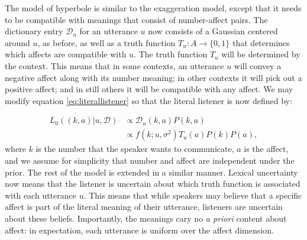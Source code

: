 \documentclass{article} %
\newcommand{\dictionary}{\ensuremath{\mathcal{D}}\xspace}
\begin{document}
The model of hyperbole is similar to the exaggeration model, except that it needs to be compatible with meanings that consist of number-affect pairs. The dictionary entry $\dictionary_u$ for an utterance $u$ now consists of a Gaussian centered around $u$, as before, as well as a truth function $T_u:A\rightarrow \{0,1\}$ that determines which affects are compatible with $u$. The truth function $T_u$ will be determined by the context. This means that in some contexts, an utterance $u$ will convey a negative affect along with its number meaning; in other contexts it will pick out a positive affect; and in still others it will be compatible with any affect. We may modify equation \ref{eq:literallistener} so that the literal listener is now defined by:

\begin{align}\label{eq:affectliteral}
L_0((k,a) | u, \dictionary) &\propto \dictionary_u(k,a)P(k,a) \\
&\propto f(k;u,\sigma^2)T_u(a)P(k)P(a),
\end{align}
where $k$ is the number that the speaker wants to communicate, $a$ is the affect, and we assume for simplicity that number and affect are independent under the prior. 
The rest of the model is extended in a similar manner. Lexical uncertainty now means that the listener is uncertain about which truth function is associated with each utterance $u$. This means that while speakers may believe that a specific affect is part of the literal meaning of their utterance, listeners are uncertain about these beliefs. Importantly, the meanings cary no \emph{a priori} content about affect: in expectation, each utterance is uniform over the affect dimension. 
\end{document}
